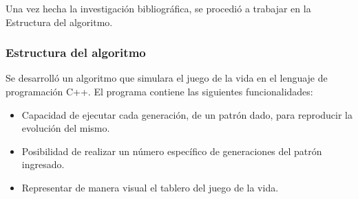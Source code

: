 \documentclass[12pt,letterpaper]{article}
\begin{document}
Una vez hecha la investigación bibliográfica, se procedió a trabajar en la Estructura del algoritmo.

\subsubsection{Estructura del algoritmo}
Se desarrolló un algoritmo que simulara el juego de la vida en el lenguaje de programación C++. El programa contiene las siguientes funcionalidades:

\begin{itemize}

\item Capacidad de ejecutar cada generación, de un patrón dado, para reproducir la evolución del mismo.
\item Posibilidad de realizar un número específico de generaciones del patrón ingresado.
\item Representar de manera visual el tablero del juego de la vida.

\end{itemize}
\end{document}
